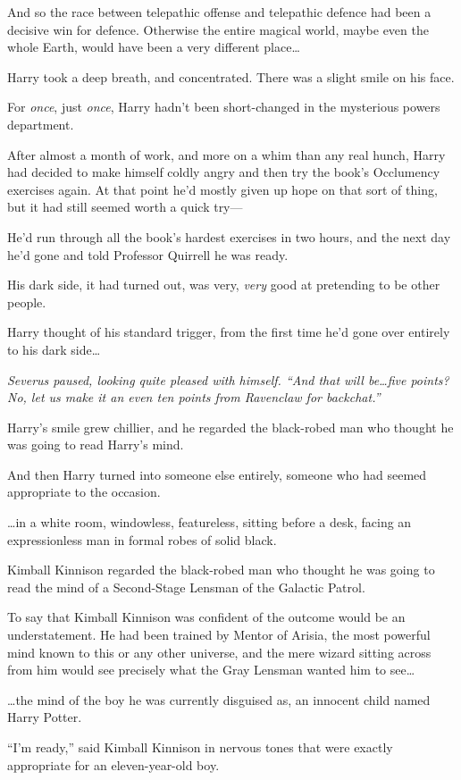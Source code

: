 And so the race between telepathic offense and telepathic defence had been a decisive win for defence. Otherwise the entire magical world, maybe even the whole Earth, would have been a very different place…

Harry took a deep breath, and concentrated. There was a slight smile on his face.

For \emph{once}, just \emph{once}, Harry hadn’t been short-changed in the mysterious powers department.

After almost a month of work, and more on a whim than any real hunch, Harry had decided to make himself coldly angry and then try the book’s Occlumency exercises again. At that point he’d mostly given up hope on that sort of thing, but it had still seemed worth a quick try—

He’d run through all the book’s hardest exercises in two hours, and the next day he’d gone and told Professor Quirrell he was ready.

His dark side, it had turned out, was very, \emph{very} good at pretending to be other people.

Harry thought of his standard trigger, from the first time he’d gone over entirely to his dark side…

\emph{Severus paused, looking quite pleased with himself. “And that will be…five points? No, let us make it an even ten points from Ravenclaw for backchat.”}

Harry’s smile grew chillier, and he regarded the black-robed man who thought he was going to read Harry’s mind.

And then Harry turned into someone else entirely, someone who had seemed appropriate to the occasion.

…in a white room, windowless, featureless, sitting before a desk, facing an expressionless man in formal robes of solid black.

Kimball Kinnison regarded the black-robed man who thought he was going to read the mind of a Second-Stage Lensman of the Galactic Patrol.

To say that Kimball Kinnison was confident of the outcome would be an understatement. He had been trained by Mentor of Arisia, the most powerful mind known to this or any other universe, and the mere wizard sitting across from him would see precisely what the Gray Lensman wanted him to see…

…the mind of the boy he was currently disguised as, an innocent child named Harry Potter.

“I’m ready,” said Kimball Kinnison in nervous tones that were exactly appropriate for an eleven-year-old boy.


